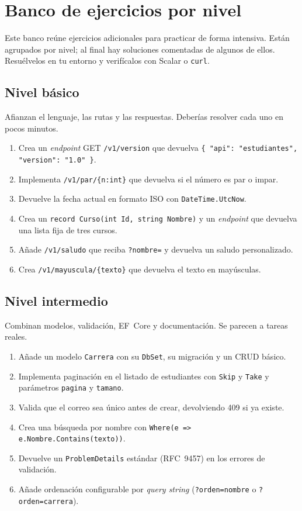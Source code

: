 \documentclass[11pt]{article}
\begin{document}
\section{Banco de ejercicios por nivel}
Este banco reúne ejercicios adicionales para practicar de forma intensiva. Están agrupados por nivel; al final hay soluciones comentadas de algunos de ellos. Resuélvelos en tu entorno y verifícalos con Scalar o \texttt{curl}.

\subsection{Nivel básico}
Afianzan el lenguaje, las rutas y las respuestas. Deberías resolver cada uno en pocos minutos.

\begin{enumerate}[leftmargin=1.7em,itemsep=3pt,topsep=2pt]
\item Crea un \emph{endpoint} GET \texttt{/v1/version} que devuelva \texttt{\{ "api": "estudiantes", "version": "1.0" \}}.
\item Implementa \texttt{/v1/par/\{n:int\}} que devuelva si el número es par o impar.
\item Devuelve la fecha actual en formato ISO con \texttt{DateTime.UtcNow}.
\item Crea un \texttt{record Curso(int Id, string Nombre)} y un \emph{endpoint} que devuelva una lista fija de tres cursos.
\item Añade \texttt{/v1/saludo} que reciba \texttt{?nombre=} y devuelva un saludo personalizado.
\item Crea \texttt{/v1/mayuscula/\{texto\}} que devuelva el texto en mayúsculas.
\end{enumerate}

\subsection{Nivel intermedio}
Combinan modelos, validación, EF~Core y documentación. Se parecen a tareas reales.

\begin{enumerate}[leftmargin=1.7em,itemsep=3pt,topsep=2pt]
\item Añade un modelo \texttt{Carrera} con su \texttt{DbSet}, su migración y un CRUD básico.
\item Implementa paginación en el listado de estudiantes con \texttt{Skip} y \texttt{Take} y parámetros \texttt{pagina} y \texttt{tamano}.
\item Valida que el correo sea único antes de crear, devolviendo 409 si ya existe.
\item Crea una búsqueda por nombre con \texttt{Where(e => e.Nombre.Contains(texto))}.
\item Devuelve un \texttt{ProblemDetails} estándar (RFC~9457) en los errores de validación.
\item Añade ordenación configurable por \emph{query string} (\texttt{?orden=nombre} o \texttt{?orden=carrera}).
\end{enumerate}
\end{document}
